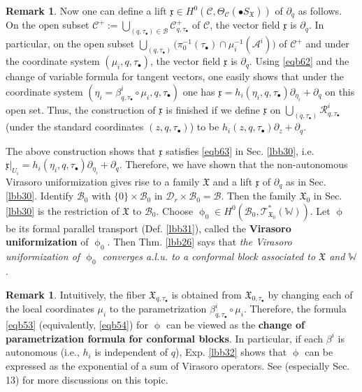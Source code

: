 \documentclass[11pt,b5paper,notitlepage]{article}
\theoremstyle{definition}
\newtheorem{rem}[df]{Remark}
\theoremstyle{plain}
\newcommand{\fk}{\mathfrak}
\newcommand{\mc}{\mathcal}
\newcommand{\scr}{\mathscr}
\newcommand{\xk}{\mathfrak x}
\newcommand{\SX}{{S_{\fk X}}}
\newcommand{\blt}{\bullet}
\newcommand{\Wbb}{\mathbb W}
\newcommand{\<}{\left\langle}
\renewcommand{\>}{\right\rangle}
\newcommand{\MC}{\mathcal{C}}
\newcommand{\MB}{\mathcal{B}}
\newcommand{\fx}{\mathfrak{X}}
\newcommand{\dps}{\displaystyle}
\numberwithin{equation}{subsection}
\begin{document}
\begin{rem}
Now one can define a lift $\xk\in H^0(\MC,\Theta_\MC(\blt\SX))$ of $\partial_q$ as follows. On the open subset $\dps\MC^+:=\bigcup_{(q,\tau_\blt)\in\MB}\MC^+_{q,\tau_\blt}$ of $\MC$, the vector field $\xk$ is $\partial_q$. In particular, on the open subset $\dps\bigcup_{(q,\tau_\blt)}\big(\pi^{-1}_0(\tau_\blt)\cap\mu_i^{-1}(\mc A^i)\big)$ of $\MC^+$ and under the coordinate system $(\mu_i,q,\tau_\blt)$, the vector field $\xk$ is $\partial_q$. Using \eqref{eqb62} and the change of variable formula for tangent vectors, one easily shows that under the coordinate system $(\eta_i=\beta^i_{q,\tau_\blt}\circ\mu_i,q,\tau_\blt)$ one has $\xk=h_i(\eta_i,q,\tau_\blt)\partial_{\eta_i}+\partial_q$ on this open set. Thus, the construction of $\xk$ is finished if we define $\xk$ on $\dps\bigcup_{(q,\tau_\blt)}\mc R^i_{q,\tau_\blt}$ (under the standard coordinates $(z,q,\tau_\blt)$) to be $h_i(z,q,\tau_\blt)\partial_z+\partial_q$.
\end{rem}

The above construction shows that $\xk$ satisfies \eqref{eqb63} in Sec. \ref{lbb30}, i.e. $\xk|_{U_i}=h_i(\eta_i,q,\tau_\blt)\partial_{\eta_i}+\partial_q$. Therefore, we have shown that the non-autonomous Virasoro uniformization gives rise to a family $\fk X$ and a lift $\xk$ of $\partial_q$ as in Sec. \ref{lbb30}. Identify $\MB_0$ with $\{0\}\times\MB_0$ in $\mc D_r\times\MB_0=\MB$. Then the family $\fx_0$ in Sec. \ref{lbb30} is the restriction of $\fx$ to $\MB_0$. Choose $\upphi_0\in H^0(\MB_0,\scr T_{\fx_0}^*(\Wbb))$. Let $\upphi$ be its formal parallel transport (Def. \ref{lbb31}), called the \textbf{Virasoro uniformization} of $\upphi_0$. Then Thm. \ref{lbb26} says that \textit{the Virasoro uniformization of $\upphi_0$ converges a.l.u. to a conformal block associated to $\fx$ and $\Wbb$}. 

\begin{rem}
Intuitively, the fiber $\fx_{q,\tau_\blt}$ is obtained from $\fx_{0,\tau_\blt}$ by changing each of the local coordinates $\mu_i$ to the parametrization $\beta^i_{q,\tau_\blt}\circ\mu_i$. Therefore, the formula \eqref{eqb53} (equivalently, \eqref{eqb54}) for $\upphi$ can be viewed as the \textbf{change of parametrization formula for conformal blocks}. In particular, if each $\beta^i$ is autonomous (i.e., $h_i$ is independent of $q$), Exp. \ref{lbb32} shows that $\upphi$ can be expressed as the exponential of a sum of Virasoro operators. See \cite{GuiLec} (especially Sec. 13) for more discussions on this topic.
\end{rem}
\end{document}
